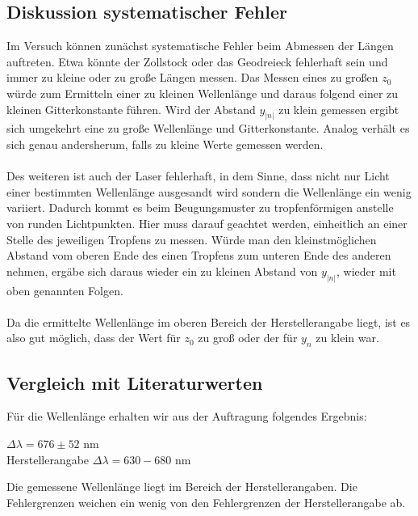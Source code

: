 \documentclass[12pt,a4paper,titlepage,headinclude,bibtotoc]{scrartcl}
\begin{document}
\subsection{Diskussion systematischer Fehler}
Im Versuch können zunächst systematische Fehler beim Abmessen der Längen auftreten. Etwa könnte der Zollstock oder das Geodreieck fehlerhaft sein und immer zu kleine oder zu große Längen messen. Das Messen eines zu großen $z_0$ würde zum Ermitteln einer zu kleinen Wellenlänge und daraus folgend einer zu kleinen Gitterkonstante führen. Wird der Abstand $y_{|n|}$ zu klein gemessen ergibt sich umgekehrt eine zu große Wellenlänge und Gitterkonstante. Analog verhält es sich genau andersherum, falls zu kleine Werte gemessen werden.\\\\
Des weiteren ist auch der Laser fehlerhaft, in dem Sinne, dass nicht nur Licht einer bestimmten Wellenlänge ausgesandt wird sondern die Wellenlänge ein wenig variiert. Dadurch kommt es beim Beugungsmuster zu tropfenförmigen anstelle von runden Lichtpunkten. Hier muss darauf geachtet werden, einheitlich an einer Stelle des jeweiligen Tropfens zu messen. Würde man den kleinstmöglichen Abstand vom oberen Ende des einen Tropfens zum unteren Ende des anderen nehmen, ergäbe sich daraus wieder ein zu kleinen Abstand von $y_{|n|}$, wieder mit oben genannten Folgen.\\\\

Da die ermittelte Wellenlänge im oberen Bereich der Herstellerangabe liegt, ist es also gut möglich, dass der Wert für $z_0$ zu groß oder der für $y_n$ zu klein war.
  
\subsection{Vergleich mit Literaturwerten}

Für die Wellenlänge erhalten wir aus der Auftragung folgendes Ergebnis:\\
\begin{center}
$\Delta \lambda = 676 \pm 52  $ nm\\
Herstellerangabe $ \Delta \lambda = 630-680 $ nm\\
\end{center}

Die gemessene Wellenlänge liegt im Bereich der Herstellerangaben. Die Fehlergrenzen weichen ein wenig von den Fehlergrenzen der Herstellerangabe ab.\\\\
\end{document}
